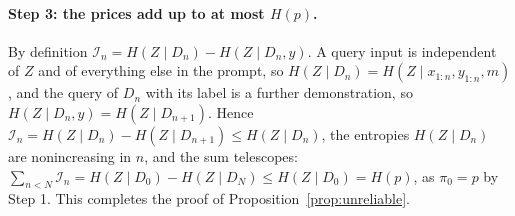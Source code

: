 \documentclass{article}
\begin{document}
\paragraph{Step 3: the prices add up to at most $H(p)$.}
By definition $\mathcal{I}_n = H(Z \mid D_n) - H(Z \mid D_n, y)$. A query input is independent of $Z$ and of everything else in the prompt, so $H(Z \mid D_n) = H(Z \mid x_{1:n}, y_{1:n}, m)$, and the query of $D_n$ with its label is a further demonstration, so $H(Z \mid D_n, y) = H(Z \mid D_{n+1})$. Hence $\mathcal{I}_n = H(Z \mid D_n) - H(Z \mid D_{n+1}) \le H(Z \mid D_n)$, the entropies $H(Z \mid D_n)$ are nonincreasing in $n$, and the sum telescopes: $\sum_{n < N} \mathcal{I}_n = H(Z \mid D_0) - H(Z \mid D_N) \le H(Z \mid D_0) = H(p)$, as $\pi_0 = p$ by Step 1. This completes the proof of Proposition~\ref{prop:unreliable}.
\end{document}
